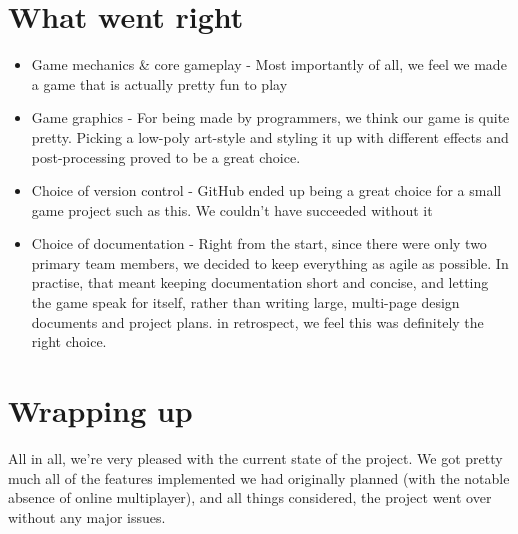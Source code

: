 \documentclass[
  oneside,
  11pt, a4paper,
  footinclude=true,
  headinclude=true,
  cleardoublepage=empty
]{scrbook}
\begin{document}
\section{What went right}
\begin{itemize}
\item Game mechanics \& core gameplay - Most importantly of all, we feel we made a game that is actually pretty fun to play
\item Game graphics - For being made by programmers, we think our game is quite pretty. Picking a low-poly art-style and styling it up with different effects and post-processing proved to be a great choice.
\item Choice of version control  - GitHub ended up being a great choice for a small game project such as this. We couldn't  have succeeded without it
\item Choice of documentation - Right from the start, since there were only two primary team members, we decided to keep everything as agile as possible. In practise, that meant keeping documentation short and concise, and letting the game speak for itself, rather than writing large, multi-page design documents and project plans. in retrospect, we feel this was definitely the right choice.
\end{itemize}
\section{Wrapping up}
All in all, we're very pleased with the current state of the project. We got pretty much all of the features implemented we had originally planned (with the notable absence of online multiplayer), and all things considered, the project went over without any major issues.
\end{document}
